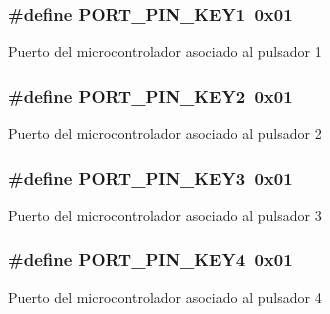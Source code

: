 \subsubsection[{\texorpdfstring{P\+O\+R\+T\+\_\+\+P\+I\+N\+\_\+\+K\+E\+Y1}{PORT_PIN_KEY1}}]{\setlength{\rightskip}{0pt plus 5cm}\#define P\+O\+R\+T\+\_\+\+P\+I\+N\+\_\+\+K\+E\+Y1~0x01}\hypertarget{group__hardware_gafe1bf3da61040955deda9703ee539687}{}\label{group__hardware_gafe1bf3da61040955deda9703ee539687}
Puerto del microcontrolador asociado al pulsador 1 
\subsubsection[{\texorpdfstring{P\+O\+R\+T\+\_\+\+P\+I\+N\+\_\+\+K\+E\+Y2}{PORT_PIN_KEY2}}]{\setlength{\rightskip}{0pt plus 5cm}\#define P\+O\+R\+T\+\_\+\+P\+I\+N\+\_\+\+K\+E\+Y2~0x01}\hypertarget{group__hardware_ga2cc4114181749a25732e31ed271a1f6b}{}\label{group__hardware_ga2cc4114181749a25732e31ed271a1f6b}
Puerto del microcontrolador asociado al pulsador 2 
\subsubsection[{\texorpdfstring{P\+O\+R\+T\+\_\+\+P\+I\+N\+\_\+\+K\+E\+Y3}{PORT_PIN_KEY3}}]{\setlength{\rightskip}{0pt plus 5cm}\#define P\+O\+R\+T\+\_\+\+P\+I\+N\+\_\+\+K\+E\+Y3~0x01}\hypertarget{group__hardware_ga5f697895be4580f403de4a9f75ab8a3b}{}\label{group__hardware_ga5f697895be4580f403de4a9f75ab8a3b}
Puerto del microcontrolador asociado al pulsador 3 
\subsubsection[{\texorpdfstring{P\+O\+R\+T\+\_\+\+P\+I\+N\+\_\+\+K\+E\+Y4}{PORT_PIN_KEY4}}]{\setlength{\rightskip}{0pt plus 5cm}\#define P\+O\+R\+T\+\_\+\+P\+I\+N\+\_\+\+K\+E\+Y4~0x01}\hypertarget{group__hardware_gac86eb82e082d51cc0d4b0a87680cd7da}{}\label{group__hardware_gac86eb82e082d51cc0d4b0a87680cd7da}
Puerto del microcontrolador asociado al pulsador 4 
